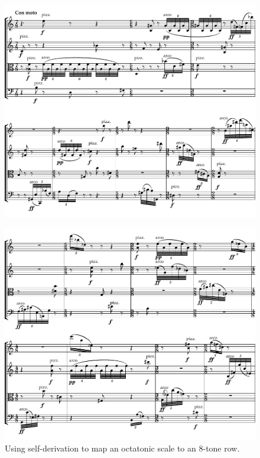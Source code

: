 \vspace{-1pt}

\begin{figure}[H]
\centering
\includegraphics[width=6.5in]{figures/Example_Quartet_1.pdf}
\end{figure}

\begin{figure}[H]
\centering
\includegraphics[width=6.5in]{figures/Example_Quartet_2.pdf}
\caption[Using self-derivation with an octatonic scale.]{Using self-derivation to map an octatonic scale to an 8-tone row.}
\label{fig:quartet}
\end{figure}

